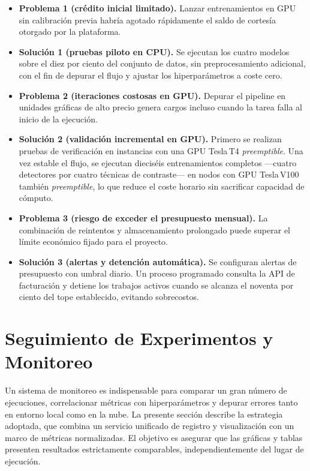\begin{itemize}

  \item \textbf{Problema 1 (crédito inicial limitado).}
        Lanzar entrenamientos en GPU sin calibración previa habría agotado rápidamente el saldo de cortesía otorgado por la plataforma.

  \item \textbf{Solución 1 (pruebas piloto en CPU).}
        Se ejecutan los cuatro modelos sobre el diez por ciento del conjunto de datos, sin preprocesamiento adicional, con el fin de depurar el flujo y ajustar los hiperparámetros a coste cero.

  \item \textbf{Problema 2 (iteraciones costosas en GPU).}
        Depurar el pipeline en unidades gráficas de alto precio genera cargos incluso cuando la tarea falla al inicio de la ejecución.

  \item \textbf{Solución 2 (validación incremental en GPU).}
        Primero se realizan pruebas de verificación en instancias con una GPU Tesla\,T4 \emph{preemptible}.
        Una vez estable el flujo, se ejecutan dieciséis entrenamientos completos —cuatro detectores por cuatro técnicas de contraste— en nodos con GPU Tesla\,V100 también \emph{preemptible}, lo que reduce el coste horario sin sacrificar capacidad de cómputo.

  \item \textbf{Problema 3 (riesgo de exceder el presupuesto mensual).}
        La combinación de reintentos y almacenamiento prolongado puede superar el límite económico fijado para el proyecto.

  \item \textbf{Solución 3 (alertas y detención automática).}
        Se configuran alertas de presupuesto con umbral diario.
        Un proceso programado consulta la API de facturación y detiene los trabajos activos cuando se alcanza el noventa por ciento del tope establecido, evitando sobrecostos.

\end{itemize}

\section{Seguimiento de Experimentos y Monitoreo}\label{sec:tracking}

Un sistema de monitoreo es indispensable para comparar un gran número de ejecuciones, correlacionar métricas con hiperparámetros y depurar errores tanto en entorno local como en la nube.
La presente sección describe la estrategia adoptada, que combina un servicio unificado de registro y visualización con un marco de métricas normalizadas.
El objetivo es asegurar que las gráficas y tablas presenten resultados estrictamente comparables, independientemente del lugar de ejecución.

